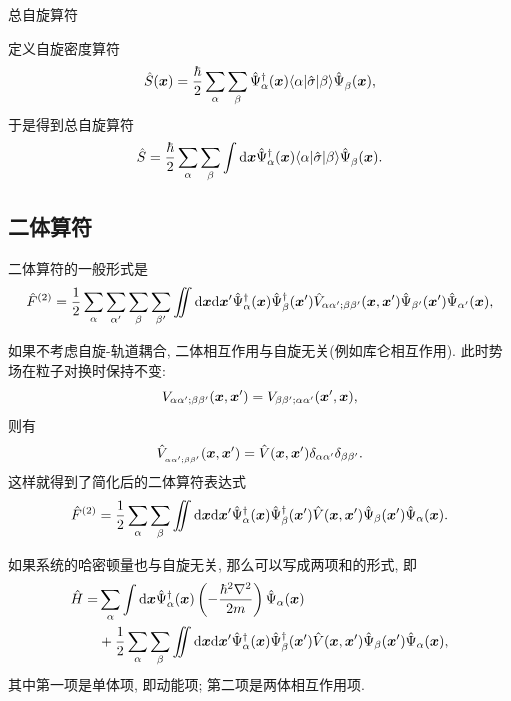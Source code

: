 \begin{example}总自旋算符

定义自旋密度算符
\begin{equation}
   \hat S(\boldsymbol{x})=\frac{\hbar}{2}\sum_\alpha\sum_\beta\hat\Psi_\alpha^\dagger(\boldsymbol{x})\langle \alpha|\hat {\sigma}|\beta \rangle\hat\Psi^{}_\beta(\boldsymbol{x}), 
\end{equation}
于是得到总自旋算符
\begin{equation}
   \hat S=\frac{\hbar}{2}\sum_\alpha\sum_\beta\int\mathrm d\boldsymbol{x}\hat\Psi_\alpha^\dagger(\boldsymbol{x})\langle \alpha|\hat {\sigma}|\beta\rangle\hat\Psi^{}_\beta(\boldsymbol{x}). 
\end{equation}
\end{example}

\subsection{ 二体算符}

二体算符的一般形式是
\begin{equation}
   \hat F^{(2)}=\frac{1}{2}\sum_\alpha \sum_{\alpha'}\sum_\beta\sum_{\beta'}\iint\mathrm d\boldsymbol{x}\mathrm d\boldsymbol{x}'\hat\Psi_\alpha^\dagger(\boldsymbol{x})\hat\Psi_\beta^\dagger(\boldsymbol{x}')\hat V_{\alpha\alpha';\beta\beta'}(\boldsymbol{x}, \boldsymbol{x}')\hat\Psi_{\beta'}(\boldsymbol{x}')\hat\Psi_{\alpha'}(\boldsymbol{x}), 
\end{equation}

如果不考虑自旋-轨道耦合, 二体相互作用与自旋无关(例如库仑相互作用). 此时势场在粒子对换时保持不变: 
\begin{equation}
   V_{\alpha\alpha';\beta\beta'}(\boldsymbol{x}, \boldsymbol{x}')= V_{\beta\beta';\alpha\alpha'}(\boldsymbol{x}', \boldsymbol{x}), 
\end{equation}
则有
\begin{equation}
   \hat V_{_{\alpha\alpha';\beta\beta'}}(\boldsymbol{x}, \boldsymbol{x}')=\hat V(\boldsymbol{x}, \boldsymbol{x}')\delta_{\alpha\alpha'}\delta_{\beta\beta'}. 
\end{equation}
这样就得到了简化后的二体算符表达式
\begin{equation}
   \hat F^{(2)}=\frac{1}{2}\sum_\alpha\sum_\beta\iint\mathrm d\boldsymbol{x}\mathrm d\boldsymbol{x}'\hat \Psi_\alpha^\dagger(\boldsymbol{x})\hat\Psi_\beta^\dagger(\boldsymbol{x}')\hat V(\boldsymbol{x}, \boldsymbol{x}')\hat\Psi_\beta(\boldsymbol{x}')\hat\Psi_\alpha(\boldsymbol{x}). 
\end{equation}

如果系统的哈密顿量也与自旋无关, 那么可以写成两项和的形式, 即
\begin{align}
   \hat H=&\sum_\alpha\int\mathrm d\boldsymbol{x}\hat\Psi_\alpha^\dagger(\boldsymbol{x})\left( -\frac{\hbar^2\nabla^2}{2m} \right)\hat\Psi_\alpha(\boldsymbol{x})\nonumber\\
&+\frac{1}{2}\sum_\alpha\sum_\beta\iint \mathrm d\boldsymbol{x}\mathrm d\boldsymbol{x}'\hat\Psi_\alpha^\dagger(\boldsymbol{x})\hat\Psi_\beta^\dagger(\boldsymbol{x}')\hat V(\boldsymbol{x}, \boldsymbol{x}')\hat\Psi_\beta(\boldsymbol{x}')\hat\Psi_\alpha(\boldsymbol{x}), 
\end{align}
其中第一项是单体项, 即动能项; 第二项是两体相互作用项. 

